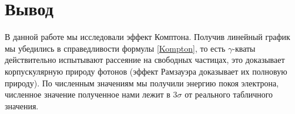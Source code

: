     \section*{Вывод}

    В данной работе мы исследовали эффект Комптона. Получив линейный график мы убедились в справедливости формулы \eqref{Kompton}, 
    то есть $\gamma$-кваты действительно испытывают рассеяние на свободных частицах, это доказывает корпускулярную
    природу фотонов (эффект Рамзауэра доказывает их полновую природу). По численным значениям мы получили энергию покоя электрона,
    численное значение полученное нами лежит в $3 \sigma$ от реального табличного значения.

